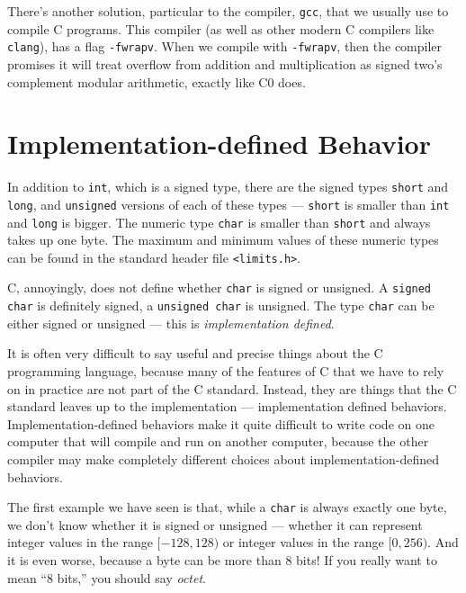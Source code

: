 There's another solution, particular to the compiler, \lstinline'gcc',
that we usually use to compile C programs. This compiler (as well as
other modern C compilers like \lstinline'clang'), has a flag
\lstinline'-fwrapv'. When we compile with \lstinline'-fwrapv', then
the compiler promises it will treat overflow from addition and
multiplication as signed two's complement modular arithmetic, exactly
like C0 does.


\section{Implementation-defined Behavior}
\label{sec:types:implementation_defined}

In addition to \lstinline'int', which is a signed type, there are the
signed types \lstinline'short' and \lstinline'long', and
\lstinline'unsigned' versions of each of these types ---
\lstinline'short' is smaller than \lstinline'int' and \lstinline'long'
is bigger. The numeric type \lstinline'char' is smaller than
\lstinline'short' and always takes up one byte.  The maximum and
minimum values of these numeric types can be found in the standard
header file \lstinline'<limits.h>'.

C, annoyingly, does not define whether \lstinline'char' is signed or
unsigned. A \lstinline'signed char' is definitely signed, a
\lstinline'unsigned char' is unsigned. The type \lstinline'char' can
be either signed or unsigned --- this is \emph{implementation
  defined}.

It is often very difficult to say useful and precise things about the
C programming language, because many of the features of C that we have
to rely on in practice are not part of the C standard. Instead, they
are things that the C standard leaves up to the implementation ---
implementation defined behaviors. Implementation-defined behaviors
make it quite difficult to write code on one computer that will
compile and run on another computer, because the other compiler may
make completely different choices about implementation-defined
behaviors.

The first example we have seen is that, while a \lstinline'char' is
always exactly one byte, we don't know whether it is signed or
unsigned --- whether it can represent integer values in the range
$\lbrack -128,128)$ or integer values in the range $\lbrack 0,256)$. And it is even
worse, because a byte can be more than 8 bits! If you really want to
mean ``8 bits,'' you should say \emph{octet}.

